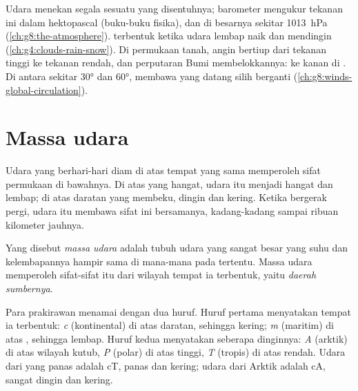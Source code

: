 \begin{recall}
Udara menekan segala sesuatu yang disentuhnya; barometer mengukur tekanan
ini dalam hektopascal (buku-buku fisika), dan di  besarnya
sekitar \qty{1013}{hPa} (\cref{ch:g8:the-atmosphere}).  terbentuk
ketika udara lembap naik dan mendingin (\cref{ch:g4:clouds-rain-snow}). Di
permukaan tanah, angin bertiup dari tekanan tinggi ke tekanan rendah, dan
perputaran Bumi membelokkannya: ke kanan di . Di antara
sekitar \ang{30} dan \ang{60},  membawa  yang datang
silih berganti (\cref{ch:g8:winds-global-circulation}).
\end{recall}

\section{Massa udara}

Udara yang berhari-hari diam di atas tempat yang sama memperoleh sifat
permukaan di bawahnya. Di atas  yang hangat, udara itu menjadi
hangat dan lembap; di atas daratan yang membeku, dingin dan kering. Ketika
bergerak pergi, udara itu membawa sifat ini bersamanya, kadang-kadang
sampai ribuan kilometer jauhnya.

\begin{definition}\label{def:g8:fronts-and-weather-maps:air-mass}
Yang disebut \emph{massa udara} adalah tubuh udara yang
sangat besar yang suhu dan kelembapannya hampir sama di mana-mana pada
 tertentu. Massa udara memperoleh sifat-sifat itu dari wilayah
tempat ia terbentuk, yaitu \emph{daerah sumbernya}.
\end{definition}

Para prakirawan menamai  dengan dua huruf. Huruf pertama
menyatakan tempat ia terbentuk: \emph{c} (kontinental) di atas daratan,
sehingga kering; \emph{m} (maritim) di atas , sehingga lembap. Huruf
kedua menyatakan seberapa dinginnya: \emph{A} (arktik) di atas wilayah
kutub, \emph{P} (polar) di atas  tinggi, \emph{T} (tropis) di atas
 rendah. Udara dari  yang panas adalah cT, panas dan kering;
udara dari Arktik adalah cA, sangat dingin dan kering.

